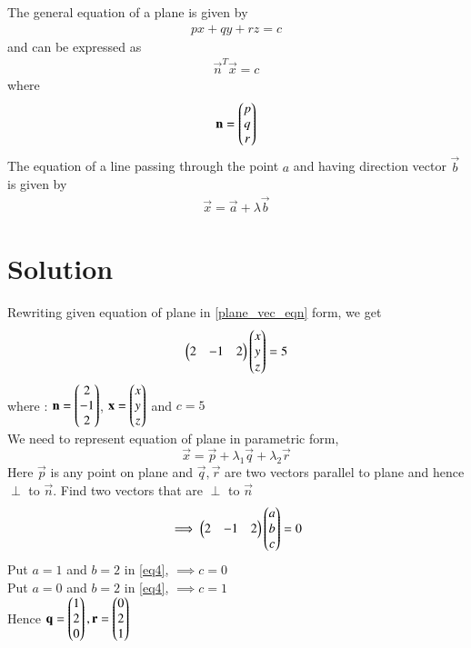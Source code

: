 \documentclass[journal,12pt,twocolumn]{IEEEtran}
\begin{document}
The general equation of a plane is given by
\begin{align}
    px+qy+rz = c \label{gen_plane_eqn}
\end{align}
and can be expressed as
\begin{align}
    \vec{n}^T\vec{x} = c \label{plane_vec_eqn}
\end{align}
where
\begin{align}
    \mathbf{n} = \begin{pmatrix}p \\ q \\ r\end{pmatrix}
\end{align}
The equation of a line passing through the point $a$ and having direction vector $\vec{b}$ is given by
\begin{align}
    \vec{x} = \vec{a} +\lambda \vec{b} \label{vec_line_eq}
\end{align}
\section{Solution}
Rewriting given equation of plane in \eqref{plane_vec_eqn} form, we get
\begin{align}\label{eq2}
	\begin{pmatrix}2 & -1 & 2\end{pmatrix}\begin{pmatrix}x\\y\\z\end{pmatrix} = 5
\end{align}
where :
$\mathbf{n}=\begin{pmatrix}2\\ -1 \\2\end{pmatrix}$, $\mathbf{x} = \begin{pmatrix}x\\y\\z\end{pmatrix}$  and $c=5$\\
We need to represent equation of plane in parametric form,
\begin{equation}\label{eq3}
	\vec{x} = \vec{p} + \lambda_1\vec{q} + \lambda_2\vec{r}
\end{equation}
Here $\vec{p}$ is any point on plane and $\vec{q}, \vec{r}$ are two vectors parallel to plane and hence $\perp$ to $\vec{n}$. Find two vectors that are $\perp$ to $\vec{n}$
\begin{align}\label{eq4}
	\implies\begin{pmatrix}2 & -1 & 2\end{pmatrix}\begin{pmatrix}a\\b\\c\end{pmatrix} = 0
\end{align}
Put $a=1$ and $b=2$ in \eqref{eq4}, $\implies c=0$\\
Put $a=0$ and $b=2$ in \eqref{eq4}, $\implies c=1$\\
Hence $\mathbf{q} = \begin{pmatrix}1\\2\\0\end{pmatrix}, \mathbf{r} = \begin{pmatrix}0\\2\\1\end{pmatrix}$\\
\end{document}
